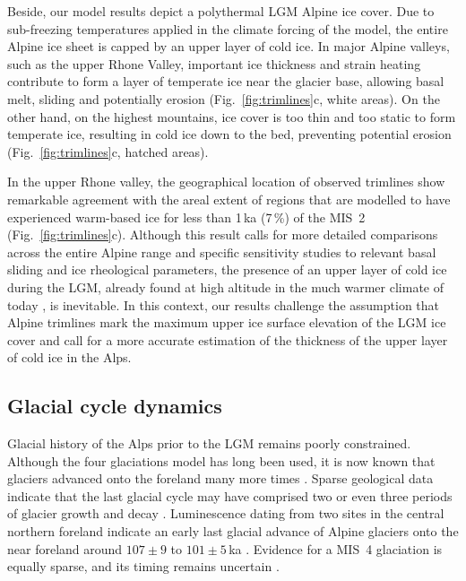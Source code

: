 \documentclass[tc, manuscript]{copernicus}
\begin{document}
    Beside, our model results depict a polythermal LGM Alpine ice cover.
    Due to sub-freezing temperatures applied in the climate forcing of the
    model, the entire Alpine ice sheet is capped by an upper layer of cold ice.
    In major Alpine valleys, such as the upper Rhone Valley, important ice
    thickness and strain heating contribute to form a layer of temperate ice
    near the glacier base, allowing basal melt, sliding and potentially
    erosion (Fig.~\ref{fig:trimlines}c, white areas). On the other hand, on the
    highest mountains, ice cover is too thin and too static to form temperate
    ice, resulting in cold ice down to the bed, preventing potential erosion
    (Fig.~\ref{fig:trimlines}c, hatched areas).

    In the upper Rhone valley, the geographical location of observed trimlines
    show remarkable agreement with the areal extent of regions that are
    modelled to have experienced warm-based ice for less than 1\,ka (7\,\%) of the
    MIS~2 (Fig.~\ref{fig:trimlines}c). Although this result calls for more
    detailed comparisons across the
    entire Alpine range and specific sensitivity studies to relevant basal
    sliding and ice rheological parameters, the presence of an upper layer of
    cold ice during the LGM, already found at high altitude in the much warmer
    climate of today \citep[e.g.,][]{Suter.etal.2001, Bohleber.etal.2017}, is
    inevitable. In this context, our results challenge the assumption that
    Alpine trimlines mark the maximum upper ice surface elevation of the LGM
    ice cover and call for a more accurate estimation of the thickness of the
    upper layer of cold ice in the Alps.


\subsection{Glacial cycle dynamics}
\label{sec:glaciations}

    Glacial history of the Alps prior to the LGM remains poorly constrained.
    Although the four glaciations model \citep{Penck.Bruckner.1909} has long
    been used, it is now known that glaciers advanced onto the foreland many
    more times \citep{Schluchter.1991, Preusser.etal.2011}. Sparse geological
    data indicate that the last glacial cycle may have comprised two or even
    three periods of glacier growth and decay \citep{Preusser.2004,Ivy-Ochs.etal.2008}.
    Luminescence dating from two sites in the central northern foreland
    indicate an early last glacial advance of Alpine glaciers onto the near
    foreland around $107\pm9$ to $101\pm5$\,ka \citep{Preusser.etal.2003,
    Preusser.Schluchter.2004}. Evidence for a MIS~4 glaciation is equally
    sparse, and its timing remains uncertain \citep[e.g.,][]{Preusser.etal.2003,
    Link.Preusser.2006}.
\end{document}
